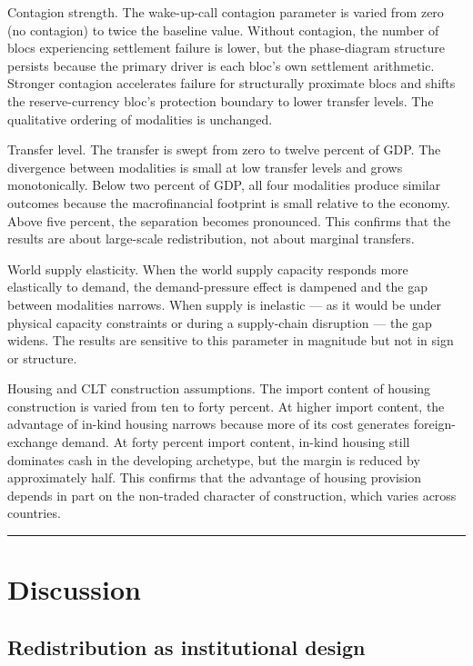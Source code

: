 \documentclass[preprint,review,12pt]{elsarticle}
\begin{document}
Contagion strength. The wake-up-call contagion parameter is varied from
zero (no contagion) to twice the baseline value. Without contagion, the
number of blocs experiencing settlement failure is lower, but the
phase-diagram structure persists because the primary driver is each
bloc's own settlement arithmetic. Stronger contagion accelerates failure
for structurally proximate blocs and shifts the reserve-currency bloc's
protection boundary to lower transfer levels. The qualitative ordering
of modalities is unchanged.

Transfer level. The transfer is swept from zero to twelve percent of
GDP. The divergence between modalities is small at low transfer levels
and grows monotonically. Below two percent of GDP, all four modalities
produce similar outcomes because the macrofinancial footprint is small
relative to the economy. Above five percent, the separation becomes
pronounced. This confirms that the results are about large-scale
redistribution, not about marginal transfers.

World supply elasticity. When the world supply capacity responds more
elastically to demand, the demand-pressure effect is dampened and the
gap between modalities narrows. When supply is inelastic --- as it would
be under physical capacity constraints or during a supply-chain
disruption --- the gap widens. The results are sensitive to this
parameter in magnitude but not in sign or structure.

Housing and CLT construction assumptions. The import content of housing
construction is varied from ten to forty percent. At higher import
content, the advantage of in-kind housing narrows because more of its
cost generates foreign-exchange demand. At forty percent import content,
in-kind housing still dominates cash in the developing archetype, but
the margin is reduced by approximately half. This confirms that the
advantage of housing provision depends in part on the non-traded
character of construction, which varies across countries.

\begin{center}\rule{0.5\linewidth}{0.5pt}\end{center}

\section{Discussion}

\subsection{Redistribution as institutional design}
\end{document}
